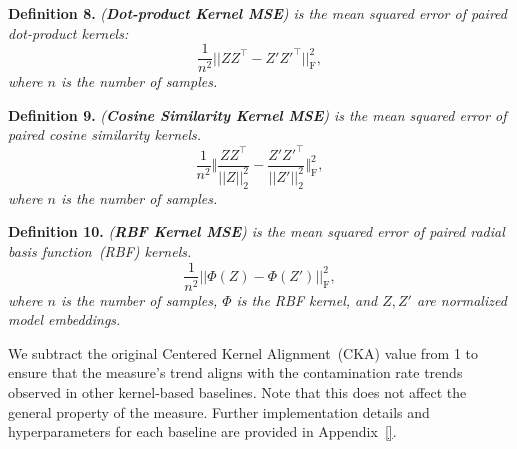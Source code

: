 \noindent\textbf{Definition 8.} \textit{(\textbf{Dot-product Kernel MSE}) is the mean squared error of paired dot-product kernels:}
\begin{equation}
    \frac{1}{n^2}||Z Z^\top - Z' Z'^\top||_\text{F}^2,
\end{equation}
\textit{where $n$ is the number of samples.}

\noindent\textbf{Definition 9.} \textit{(\textbf{Cosine Similarity Kernel MSE}) is the mean squared error of paired cosine similarity kernels.}
\begin{equation}
    \frac{1}{n^2}\bigg\Vert\frac{Z Z^\top}{||Z||_2^2} - \frac{Z' Z'^\top}{||Z'||_2^2}\bigg\Vert_\text{F}^2,
\end{equation}
\textit{where $n$ is the number of samples.}


\noindent\textbf{Definition 10.} \textit{(\textbf{RBF Kernel MSE}) is the mean squared error of paired radial basis function~(RBF) kernels.}
\begin{equation}
    \frac{1}{n^2}||\Phi(Z) - \Phi(Z')||_\text{F}^2,
\end{equation}
\textit{where $n$ is the number of samples, $\Phi$ is the RBF kernel, and $Z, Z'$ are normalized model embeddings.}

We subtract the original Centered Kernel Alignment~(CKA) value from 1 to ensure that the measure's trend aligns with the contamination rate trends observed in other kernel-based baselines.
Note that this does not affect the general property of the measure.
Further implementation details and hyperparameters for each baseline are provided in Appendix~\ref{}.
